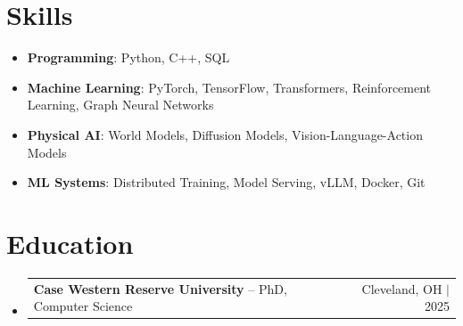 \documentclass[letterpaper,13pt]{article}
\makeatletter
\newcommand{\resumeProjectHeading}[2]{
    \item
    \begin{tabular*}{\textwidth}{l@{\extracolsep{\fill}}r}
      \small#1 & #2 \\
    \end{tabular*}\vspace{-4pt}
}
\newcommand{\resumeSubHeadingListStart}{\begin{itemize}[leftmargin=0in, label={}]}
\newcommand{\resumeSubHeadingListEnd}{\end{itemize}}
\makeatother
\begin{document}
\section{Skills}
\vspace{0.02cm}
\begin{itemize}[leftmargin=0.15in, label={}, itemsep=2pt, topsep=1pt]
  \item \textbf{Programming}: Python, C++, SQL
  \item \textbf{Machine Learning}: PyTorch, TensorFlow, Transformers, Reinforcement Learning, Graph Neural Networks
  \item \textbf{Physical AI}: World Models, Diffusion Models, Vision-Language-Action Models
  \item \textbf{ML Systems}: Distributed Training, Model Serving, vLLM, Docker, Git
\end{itemize}
\vspace{0.02cm}

\section{Education}
\resumeSubHeadingListStart
  \resumeProjectHeading{\textbf{Case Western Reserve University} -- PhD, Computer Science}{Cleveland, OH $|$ 2025}
\resumeSubHeadingListEnd
\end{document}
